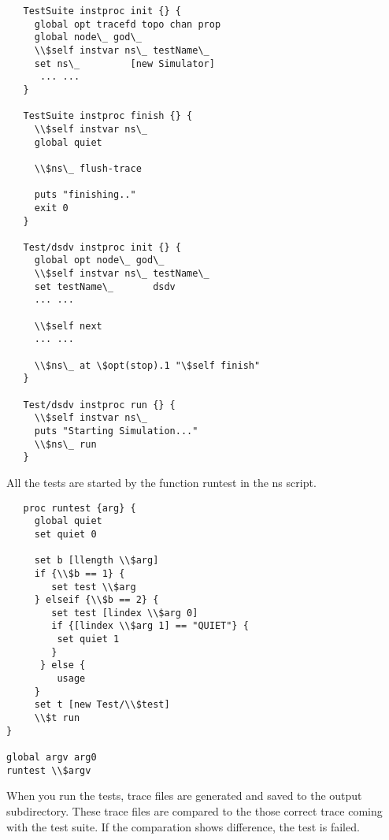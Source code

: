 \begin{verbatim}	
   TestSuite instproc init {} {
     global opt tracefd topo chan prop 
     global node\_ god\_ 
     \\$self instvar ns\_ testName\_
     set ns\_         [new Simulator]
      ... ...
   } 

   TestSuite instproc finish {} {
     \\$self instvar ns\_
     global quiet

     \\$ns\_ flush-trace

     puts "finishing.."
     exit 0
   }
        
   Test/dsdv instproc init {} {
     global opt node\_ god\_
     \\$self instvar ns\_ testName\_
     set testName\_       dsdv
     ... ...    

     \\$self next
     ... ...

     \\$ns\_ at \$opt(stop).1 "\$self finish"
   }

   Test/dsdv instproc run {} {
     \\$self instvar ns\_
     puts "Starting Simulation..."
     \\$ns\_ run
   }
\end{verbatim}

All the tests are started by the function runtest in the ns script.

\begin{verbatim}
   proc runtest {arg} {
     global quiet
     set quiet 0

     set b [llength \\$arg]
     if {\\$b == 1} {
        set test \\$arg
     } elseif {\\$b == 2} {
        set test [lindex \\$arg 0]
        if {[lindex \\$arg 1] == "QUIET"} {
         set quiet 1
        }
      } else {
         usage
     }
     set t [new Test/\\$test]
     \\$t run
}

global argv arg0
runtest \\$argv
\end{verbatim}


When you run the tests, trace files are generated and saved to the output 
subdirectory. These trace files are compared to the those correct trace coming 
with the test suite. If the comparation shows difference, the test is failed. 





